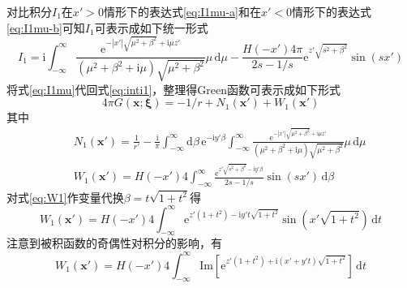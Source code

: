 对比积分$I_1$在$x'>0$情形下的表达式\eqref{eq:I1mu-a}和在$x'<0$情形下的表达式
\eqref{eq:I1mu-b}可知$I_1$可表示成如下统一形式
\begin{equation}
  I_1=\mathrm{i}\int_{-\infty}^{\infty}
  \frac{\mathrm{e}^{-|x'|\sqrt{\mu^2+\beta^2}+\mathrm{i}\mu z'}}{(\mu^2+\beta^2+\mathrm{i}\mu)\sqrt{\mu^2+\beta^2}}\mu\,\mathrm{d}\mu-\frac{H(-x')4\pi}{2s-1/s}
  \mathrm{e}^{z'\sqrt{s^2+\beta^2}}\sin(sx')
  \label{eq:I1mu}
\end{equation}
将式\eqref{eq:I1mu}代回式\eqref{eq:inti1}，整理得Green函数可表示成如下形式
\begin{equation}
  4\pi G(\mathbf{x};\bm{\xi})=-1/r+N_1(\mathbf{x'})+W_1(\mathbf{x'})
  \label{eq:Gnw}
\end{equation}
其中
\begin{eqnarray}
  && N_1(\mathbf{x'})=\frac{1}{r'}-\frac{\mathrm{i}}{\pi}\int_{-\infty}^{\infty}
  \mathrm{d}\beta\,\mathrm{e}^{-\mathrm{i}y'\beta}\int_{-\infty}^{\infty}
  \frac{\mathrm{e}^{-|x'|\sqrt{\mu^2+\beta^2}+\mathrm{i}\mu z'}}{(\mu^2+\beta^2+\mathrm{i}\mu)\sqrt{\mu^2+\beta^2}}\mu\,\mathrm{d}\mu \label{eq:N1}\\
  && W_1(\mathbf{x'})=H(-x')4\int_{-\infty}^{\infty}\frac{\mathrm{e}^{z'\sqrt{s^2+\beta^2}-\mathrm{i}y'\beta}}{2s-1/s}\sin(sx')\,\mathrm{d}\beta\label{eq:W1}
\end{eqnarray}
对式\eqref{eq:W1}作变量代换$\beta=t\sqrt{1+t^2}$得
\begin{equation*}
  W_1(\mathbf{x'})=H(-x')4\int_{-\infty}^{\infty}
  \mathrm{e}^{z'(1+t^2)-\mathrm{i}y't\sqrt{1+t^2}}\sin(x'\sqrt{1+t^2})\,
  \mathrm{d}t
\end{equation*}
注意到被积函数的奇偶性对积分的影响，有
\begin{equation}
  W_1(\mathbf{x'})=H(-x')4\int_{-\infty}^{\infty}\mathrm{Im}[
  \mathrm{e}^{z'(1+t^2)+\mathrm{i}(x'+y't)\sqrt{1+t^2}}]\,\mathrm{d}t
  \label{eq:W1im}
\end{equation}

